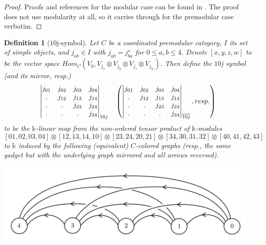 \documentclass[12pt]{extarticle}
\numberwithin{equation}{section} %
\theoremstyle{mystyle}
\newtheorem{definition}[equation]{Definition}
\begin{document}
\begin{proof}
  Proofs and references for the modular case can be found in
  \cite[section VI.5.4]{turaev-qiok-3-manifolds}. The proof does
  not use modularity at all, so it carries through for the
  premodular case verbatim.
\end{proof}

\begin{definition}[$10$j-symbol]\label{def/10j-symbol}
  Let $C$ be a coordinated premodular category, $I$ its set of
  simple objects, and $j_{ab} \in I$ with $j_{ab} = j_{ba}^{\star}$ for
  $0 \leq a, b \leq 4$.
  Denote $[x,y,z,w]$ to be the vector space
  $Hom_{C}(V_{0}, V_{j_{x}} \otimes V_{j_{y}} \otimes V_{j_{z}} \otimes V_{j_{w}})$.
  Then define the $10$j symbol (and its mirror, resp.)
  $$
  \begin{vmatrix} j_{01} & j_{02} & j_{03} & j_{04} \\ . & j_{12} & j_{13} & j_{14} \\ . & . & j_{23} & j_{24} \\ . & . & . & j_{34} \\ \end{vmatrix}_{10j} \quad \left(\begin{vmatrix} j_{01} & j_{02} & j_{03} & j_{04} \\ . & j_{12} & j_{13} & j_{14} \\ . & . & j_{23} & j_{24} \\ . & . & . & j_{34} \\ \end{vmatrix}_{\overline{10j}}, resp.\right)
  $$
  to be the $\mathbb{k}$-linear map from the non-ordered tensor
  product of $\mathbb{k}$-modules
  $$
  [01,02,03,04] \otimes
  [12,13,14,10] \otimes
  [23,24,20,21] \otimes
  [34,30,31,32] \otimes
  [40,41,42,43]
  $$
  to $\mathbb{k}$ induced by the following (equivalent)
  $C$-colored graphs (resp., the same gadget but with the
  underlying graph mirrored and all arrows reversed).
  \begin{center}\label{graph/10j-symbol}
    \includegraphics[height=4cm]{10j-plain}

\end{center}
\end{definition}
\end{document}
